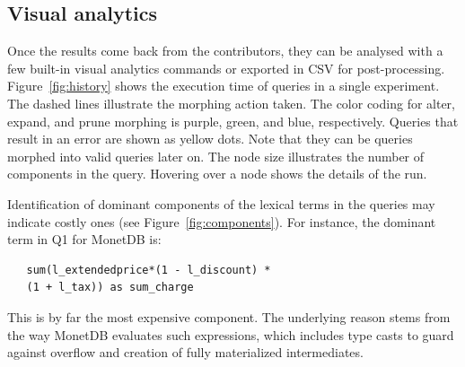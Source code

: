 \documentclass{cidr-2019}
\begin{document}
\pagebreak

\subsection{Visual analytics}

Once the results come back from the contributors, they can be analysed
with a few built-in visual analytics commands or exported in CSV for
post-processing. Figure~\ref{fig:history} shows the execution time of
queries in a single experiment. The dashed lines illustrate the
morphing action taken. The color coding for alter, expand, and prune
morphing is purple, green, and blue, respectively. Queries that result
in an error are shown as yellow dots. Note that they can be queries morphed into
valid queries later on. The node size illustrates the number of
components in the query. Hovering over a node shows the details of the run.

Identification of dominant components 
of the lexical terms in the queries may indicate
costly ones (see Figure~\ref{fig:components}). For instance, the
dominant term in Q1
for MonetDB is:
\begin{verbatim}
   sum(l_extendedprice*(1 - l_discount) * 
   (1 + l_tax)) as sum_charge
\end{verbatim}
This is by far the most expensive component. The underlying reason
stems from the way MonetDB evaluates such expressions, which includes
type casts to guard against overflow and creation of fully
materialized intermediates.
\end{document}
